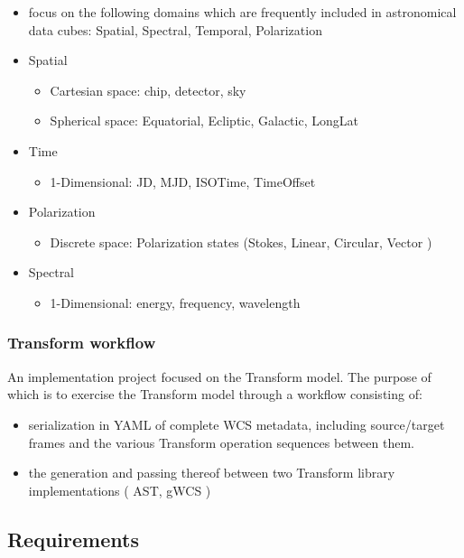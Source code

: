 \documentclass[11pt,a4paper]{ivoa}
\begin{document}
\begin{itemize}
    \begin{itemize}
       \item focus on the following domains which are frequently included in astronomical data cubes: Spatial, Spectral, Temporal, Polarization
       \item Spatial
       \begin{itemize}
          \item Cartesian space:  chip, detector, sky
          \item Spherical space: Equatorial, Ecliptic, Galactic, LongLat
       \end{itemize}
       \item Time
       \begin{itemize}
          \item 1-Dimensional: JD, MJD, ISOTime, TimeOffset
       \end{itemize}
       \item Polarization
       \begin{itemize}
          \item Discrete space: Polarization states (Stokes, Linear, Circular, Vector )
       \end{itemize}
       \item Spectral
       \begin{itemize}
          \item 1-Dimensional: energy, frequency, wavelength
       \end{itemize}
    \end{itemize}
  \end{itemize}

\subsubsection{Transform workflow}
\label{uc:Transform-workflow}
An implementation project focused on the Transform model. The purpose of which is to exercise the Transform model through a workflow consisting of:
  \begin{itemize}
    \item serialization in YAML of complete WCS metadata, including source/target frames and the various Transform operation sequences between them.
    \item the generation and passing thereof between two Transform library implementations ( AST, gWCS )
  \end{itemize}


\subsection{Requirements}
\label{sect:reqs}
\end{document}
